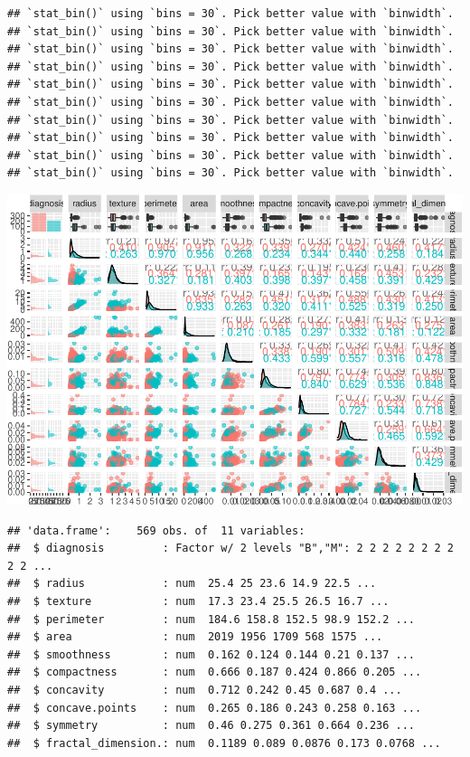\documentclass[
  11pt,
]{article}
\begin{document}
\begin{verbatim}
## `stat_bin()` using `bins = 30`. Pick better value with `binwidth`.
## `stat_bin()` using `bins = 30`. Pick better value with `binwidth`.
## `stat_bin()` using `bins = 30`. Pick better value with `binwidth`.
## `stat_bin()` using `bins = 30`. Pick better value with `binwidth`.
## `stat_bin()` using `bins = 30`. Pick better value with `binwidth`.
## `stat_bin()` using `bins = 30`. Pick better value with `binwidth`.
## `stat_bin()` using `bins = 30`. Pick better value with `binwidth`.
## `stat_bin()` using `bins = 30`. Pick better value with `binwidth`.
## `stat_bin()` using `bins = 30`. Pick better value with `binwidth`.
## `stat_bin()` using `bins = 30`. Pick better value with `binwidth`.
\end{verbatim}

\includegraphics{stat_DAP_files/figure-latex/unnamed-chunk-20-1.pdf}

\begin{verbatim}
## 'data.frame':    569 obs. of  11 variables:
##  $ diagnosis         : Factor w/ 2 levels "B","M": 2 2 2 2 2 2 2 2 2 2 ...
##  $ radius            : num  25.4 25 23.6 14.9 22.5 ...
##  $ texture           : num  17.3 23.4 25.5 26.5 16.7 ...
##  $ perimeter         : num  184.6 158.8 152.5 98.9 152.2 ...
##  $ area              : num  2019 1956 1709 568 1575 ...
##  $ smoothness        : num  0.162 0.124 0.144 0.21 0.137 ...
##  $ compactness       : num  0.666 0.187 0.424 0.866 0.205 ...
##  $ concavity         : num  0.712 0.242 0.45 0.687 0.4 ...
##  $ concave.points    : num  0.265 0.186 0.243 0.258 0.163 ...
##  $ symmetry          : num  0.46 0.275 0.361 0.664 0.236 ...
##  $ fractal_dimension.: num  0.1189 0.089 0.0876 0.173 0.0768 ...
\end{verbatim}
\end{document}
